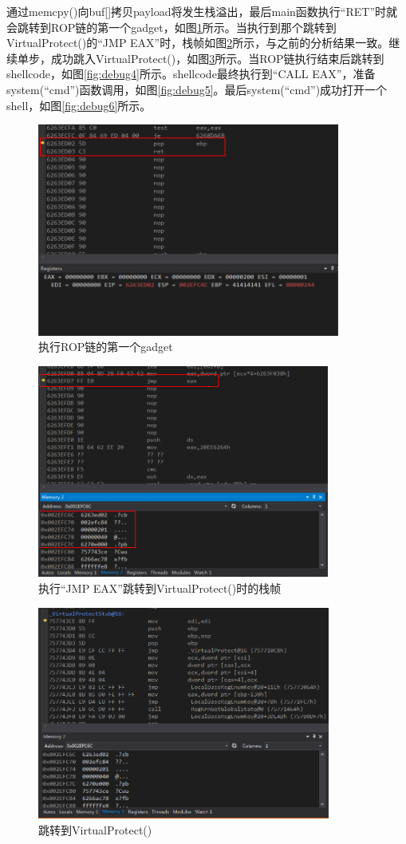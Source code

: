 \documentclass[bachelor]{thesis-uestc}
\begin{document}
通过memcpy()向buf[]拷贝payload将发生栈溢出，最后main函数执行``RET''时就会跳转到ROP链的第一个gadget，如图\ref{fig:debug1}所示。当执行到那个跳转到VirtualProtect()的``JMP EAX''时，栈帧如图\ref{fig:debug2}所示，与之前的分析结果一致。继续单步，成功跳入VirtualProtect()，如图\ref{fig:debug3}所示。当ROP链执行结束后跳转到shellcode，如图\ref{fig:debug4}所示。shellcode最终执行到``CALL EAX''，准备system(``cmd'')函数调用，如图\ref{fig:debug5}。最后system(``cmd'')成功打开一个shell，如图\ref{fig:debug6}所示。

\begin{figure}[htbp]
	\centering\includegraphics[height=7cm]{images/debug1.png}
	\caption{执行ROP链的第一个gadget}
	\label{fig:debug1}
\end{figure}

\begin{figure}[htbp]
	\centering\includegraphics[height=7cm]{images/debug2.png}
	\caption{执行``JMP EAX''跳转到VirtualProtect()时的栈帧}
	\label{fig:debug2}
\end{figure}

\begin{figure}[htbp]
	\centering\includegraphics[height=7cm]{images/debug3.png}
	\caption{跳转到VirtualProtect()}
	\label{fig:debug3}
\end{figure}
\end{document}
